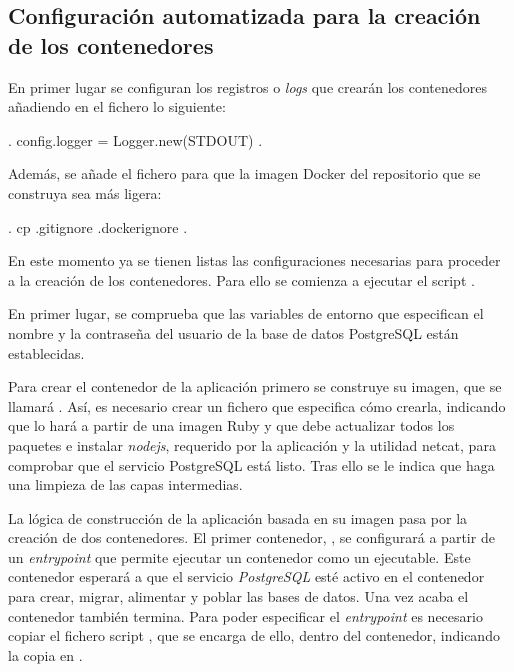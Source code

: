 \subsection{Configuración automatizada para la creación de los contenedores}

En primer lugar se configuran los registros o \textit{logs} que crearán los contenedores añadiendo en el fichero  lo siguiente:

\begin{codelisting}
\label{code:application.rb}
\begin{code}
.
config.logger = Logger.new(STDOUT)
.
\end{code}
\end{codelisting}

Además, se añade el fichero  para que la imagen Docker del repositorio que se construya sea más ligera:

\begin{codelisting}
\label{code:.dockerignore}
\begin{code}
.
cp .gitignore .dockerignore
.
\end{code}
\end{codelisting}

En este momento ya se tienen listas las configuraciones necesarias para proceder a la creación de los contenedores. Para ello se comienza a ejecutar el script .

En primer lugar, se comprueba que las variables de entorno que especifican el nombre y la contraseña del usuario de la base de datos PostgreSQL están establecidas.

Para crear el contenedor de la aplicación primero se construye su imagen, que se llamará . Así, es necesario crear un fichero  que especifica cómo crearla, indicando que lo hará a partir de una imagen Ruby y que debe actualizar todos los paquetes e instalar \textit{nodejs}, requerido por la aplicación y la utilidad netcat, para comprobar que el servicio PostgreSQL está listo. Tras ello se le indica que haga una limpieza de las capas intermedias. 

La lógica de construcción de la aplicación basada en su imagen pasa por la creación de dos contenedores. El primer contenedor, , se configurará a partir de un \textit{entrypoint} que permite ejecutar un contenedor como un ejecutable. Este contenedor esperará a que el servicio \textit{PostgreSQL} esté activo en el contenedor  para crear, migrar, alimentar y poblar las bases de datos. Una vez acaba el contenedor también termina. Para poder especificar el \textit{entrypoint} es necesario copiar el fichero script , que se encarga de ello, dentro del contenedor, indicando la copia en . 

